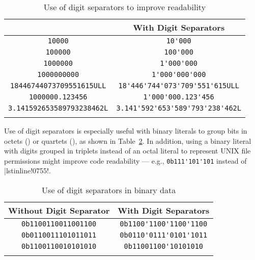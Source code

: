 \begin{table}[h!]
\begin{center}
\begin{threeparttable}
\caption{Use of digit separators to improve readability}\label{digitseparator-table1}\vspace{1.5ex}
{\small \begin{tabular}{c|c}\thickhline
\rowcolor[gray]{.9}{\sffamily\bfseries Without Digit Separator} & {\sffamily\bfseries With Digit Separators} \\ \hline
\lstinline!10000! & \lstinline!10'000! \\ \hline
\lstinline!100000! & \lstinline!100'000! \\ \hline
\lstinline!1000000! & \lstinline!1'000'000! \\ \hline
\lstinline!1000000000! & \lstinline!1'000'000'000! \\ \hline
\lstinline!18446744073709551615ULL! & \lstinline!18'446'744'073'709'551'615ULL! \\ \hline
\lstinline!1000000.123456! & \lstinline!1'000'000.123'456! \\ \hline
\lstinline!3.141592653589793238462L! & \lstinline!3.141'592'653'589'793'238'462L! \\ \thickhline
\end{tabular}
} %
\end{threeparttable}
\end{center}
\end{table}
\noindent Use of digit separators is especially useful with binary
literals to group bits in octets () or quartets
(), as shown in Table~\ref{digitseparator-table2}. In addition, using a binary literal with digits grouped in triplets instead of an octal literal to represent UNIX file permissions might improve code readability --- e.g., \lstinline!0b111'101'101! instead of |lstinline!0755!.\begin{table}[h!]
\begin{center}
\begin{threeparttable}
\caption{Use of digit separators in binary data}\label{digitseparator-table2}\vspace{1.5ex}
{\small \begin{tabular}{c|c}
\thickhline
\rowcolor[gray]{.9} {\sffamily\bfseries Without Digit Separator} & {\sffamily\bfseries With Digit Separators} \\\hline
\lstinline!0b1100110011001100! & \lstinline!0b1100'1100'1100'1100! \\ \hline
\lstinline!0b0110011101011011! & \lstinline!0b0110'0111'0101'1011! \\ \hline
\lstinline!0b1100110010101010! & \lstinline!0b11001100'10101010! \\
\thickhline
\end{tabular}
} %
\end{threeparttable}
\end{center}
\end{table}

